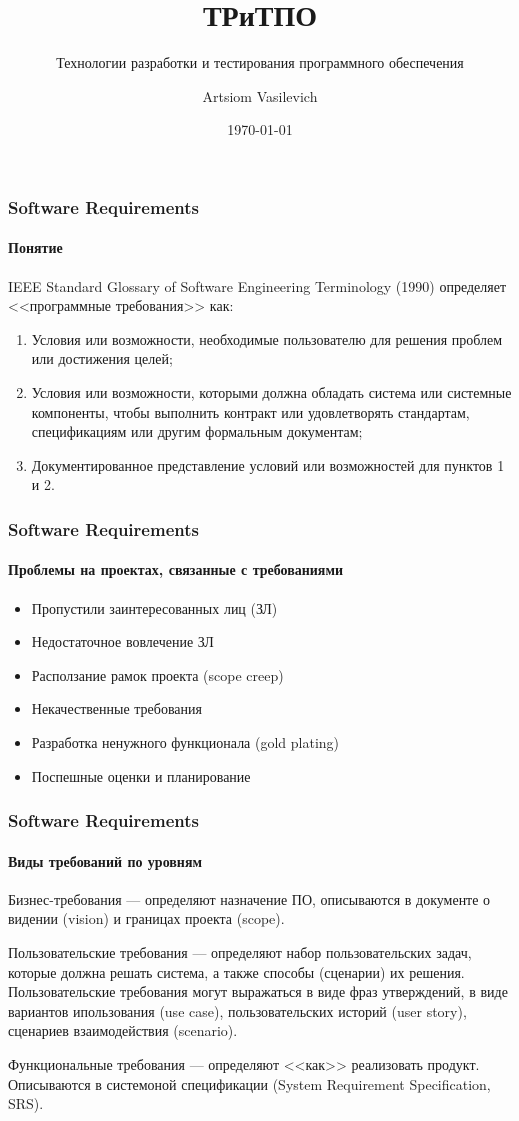 \documentclass[aspectratio=169, 12pt]{beamer}
\title{ТРиТПО}
\subtitle{Технологии разработки и тестирования программного обеспечения}
\author{Artsiom Vasilevich}
\institute[BSUIR]{Belarusian State University of Informatics and Radioelectronics}
\date{\tiny \today}
\begin{document}
\frame{\titlepage}

\begin{frame}
    \frametitle{Software Requirements}
    \framesubtitle{Понятие}
    IEEE Standard Glossary of Software Engineering Terminology (1990)
    определяет <<программные требования>> как: \pause
    \begin{enumerate}
        \item Условия или возможности, необходимые пользователю для решения
              проблем или достижения целей; \newline \pause
        \item Условия или возможности, которыми должна обладать система или
              системные компоненты, чтобы выполнить контракт или удовлетворять
              стандартам, спецификациям или другим формальным документам; \newline \pause
        \item Документированное представление условий или возможностей для
              пунктов 1 и 2.
    \end{enumerate}
\end{frame}

\begin{frame}
    \frametitle{Software Requirements}
    \framesubtitle{Проблемы на проектах, связанные с требованиями} \pause
    \begin{itemize}
        \item Пропустили заинтересованных лиц (ЗЛ) \pause
        \item Недостаточное вовлечение ЗЛ \pause
        \item Расползание рамок проекта (scope creep) \pause
        \item Некачественные требования \pause
        \item Разработка ненужного функционала (gold plating) \pause
        \item Поспешные оценки и планирование
    \end{itemize}
\end{frame}

\begin{frame}[t]
    \frametitle{Software Requirements}
    \framesubtitle{Виды требований по уровням} \pause
    Бизнес-требования --- определяют назначение ПО, описываются в документе о
    видении (vision) и границах проекта (scope). \newline \pause

    Пользовательские требования --- определяют набор пользовательских задач, которые должна
    решать система, а также способы (сценарии) их решения. Пользовательские требования
    могут выражаться в виде фраз утверждений, в виде вариантов ипользования (use case),
    пользовательских историй (user story), сценариев взаимодействия (scenario). \newline \pause

    Функциональные требования --- определяют <<как>> реализовать продукт. Описываются в системоной
    спецификации (System Requirement Specification, SRS).
\end{frame}
\end{document}
